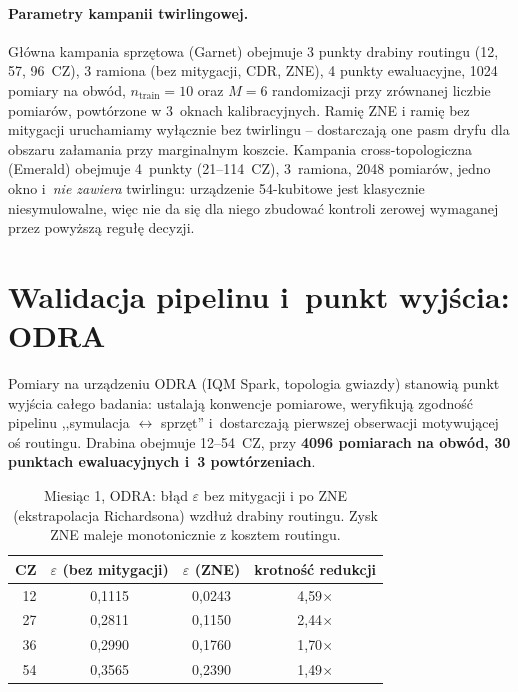 \documentclass[11pt]{article}
\begin{document}
\paragraph{Parametry kampanii twirlingowej.} Główna kampania sprzętowa (Garnet) obejmuje 3 punkty drabiny
routingu (12, 57, 96~CZ), 3 ramiona (bez mitygacji, CDR, ZNE), 4 punkty ewaluacyjne, 1024 pomiary na
obwód, $n_{\text{train}}=10$ oraz $M=6$ randomizacji przy zrównanej liczbie pomiarów, powtórzone w
3~oknach kalibracyjnych. Ramię ZNE i ramię bez mitygacji uruchamiamy wyłącznie bez twirlingu --
dostarczają one pasm dryfu dla obszaru załamania przy marginalnym koszcie. Kampania
cross-topologiczna (Emerald) obejmuje 4~punkty (21--114~CZ), 3~ramiona, 2048 pomiarów, jedno okno
i~\emph{nie zawiera} twirlingu: urządzenie 54-kubitowe jest klasycznie niesymulowalne, więc nie da
się dla niego zbudować kontroli zerowej wymaganej przez powyższą regułę decyzji.

\section{Walidacja pipelinu i~punkt wyjścia: ODRA}\label{sec:miesiac1}

Pomiary na urządzeniu ODRA (IQM Spark, topologia gwiazdy) stanowią punkt wyjścia całego badania:
ustalają konwencje pomiarowe, weryfikują zgodność pipelinu ,,symulacja $\leftrightarrow$ sprzęt''
i~dostarczają pierwszej obserwacji motywującej oś routingu. Drabina obejmuje 12--54~CZ, przy
\textbf{4096 pomiarach na obwód, 30 punktach ewaluacyjnych i~3 powtórzeniach}.

\begin{table}[!ht]\centering
\caption{Miesiąc 1, ODRA: błąd $\varepsilon$ bez mitygacji i po ZNE (ekstrapolacja Richardsona) wzdłuż
drabiny routingu. Zysk ZNE maleje monotonicznie z kosztem routingu.}
\label{tab:m1}
\begin{tabular}{rccc}
\toprule
CZ & $\varepsilon$ (bez mitygacji) & $\varepsilon$ (ZNE) & krotność redukcji \\
\midrule
12 & 0{,}1115 & 0{,}0243 & 4{,}59$\times$ \\
27 & 0{,}2811 & 0{,}1150 & 2{,}44$\times$ \\
36 & 0{,}2990 & 0{,}1760 & 1{,}70$\times$ \\
54 & 0{,}3565 & 0{,}2390 & 1{,}49$\times$ \\
\bottomrule
\end{tabular}
\end{table}
\end{document}
